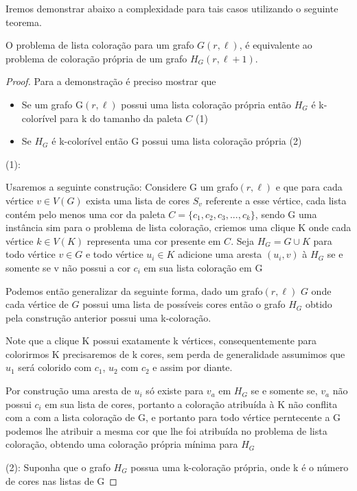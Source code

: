 Iremos demonstrar abaixo a complexidade para tais casos utilizando o seguinte teorema. 
\begin{teorema}
\label{theorem:list-coloring}
	O problema de lista coloração para um grafo $G(r,\ell)$, é equivalente ao problema de coloração própria de um grafo $H_G(r,\ell+1)$.
\end{teorema}
\begin{proof}
	Para a demonstração é preciso mostrar que
	\begin{itemize}
		\item Se um grafo G$(r,\ell)$ possui uma lista coloração própria então $H_G$ é k-colorível para k do tamanho da paleta $C$ (1)
		\item Se $H_G$ é k-colorível então G possui uma lista coloração própria (2)
	\end{itemize}
	(1):\newline
	
	Usaremos a seguinte construção:\newline
	Considere G um grafo$(r,\ell)$ e que para cada vértice $v \in V(G)$ exista uma lista de cores $S_v$ referente a esse vértice, cada lista contém pelo menos uma cor da paleta $C = \{c_1,c_2,c_3,...,c_k \}$, sendo G uma instância sim para o problema de lista coloração, criemos uma clique K onde cada vértice $k \in V(K)$ representa uma cor presente em $C$. Seja $H_G = G \cup K$ para todo vértice $v \in G$ e todo vértice $u_i \in K$ adicione uma aresta $(u_i,v)$ à $H_G$ se e somente se v não possui a cor $c_i$ em sua lista coloração em G
	
	Podemos então generalizar da seguinte forma, dado um grafo$(r,\ell)$ $G$ onde cada vértice de $G$ possui uma lista de possíveis cores então o grafo $H_G$ obtido pela construção anterior possui uma k-coloração.
	
	Note que a clique K possui exatamente k vértices, consequentemente para colorirmos K precisaremos de k cores, sem perda de generalidade assumimos que $u_1$ será colorido com $c_1$, $u_2$ com $c_2$ e assim por diante.
	
	Por construção uma aresta de $u_i$ só existe para $v_a$ em $H_G$ se e somente se, $v_a$ não possui $c_i$ em sua lista de cores, portanto a coloração atribuída à K não conflita com a com a lista coloração de G, e portanto para todo vértice perntecente a G podemos lhe atribuir a mesma cor que lhe foi atribuída no problema de lista coloração, obtendo uma coloração própria mínima para $H_G$
	
	(2):\newline
	Suponha que o grafo $H_G$ possua uma k-coloração própria, onde k é o número de cores nas listas de G
	

\end{proof}
